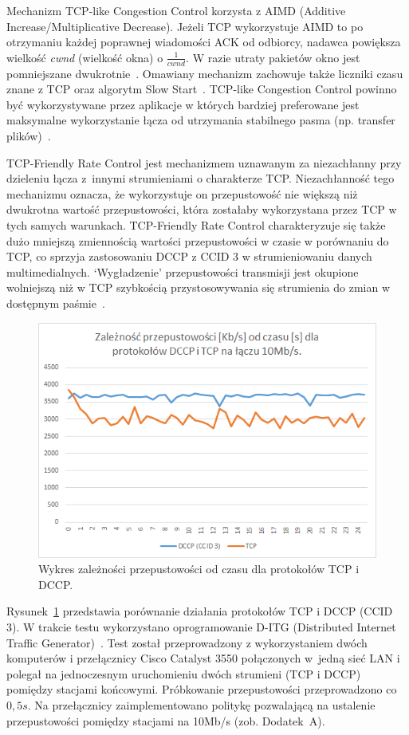 Mechanizm TCP-like Congestion Control korzysta z AIMD (Additive Increase/Multiplicative Decrease). Jeżeli TCP wykorzystuje AIMD to po otrzymaniu każdej poprawnej wiadomości ACK od odbiorcy, nadawca powiększa wielkość \textit{cwnd} (wielkość okna) o $\frac{1}{cwnd}$. W razie utraty pakietów okno jest pomniejszane dwukrotnie~\cite{Stevens}. Omawiany mechanizm zachowuje także liczniki czasu znane z TCP oraz algorytm Slow Start~\cite{RFC2581}. TCP-like Congestion Control powinno być wykorzystywane przez aplikacje w których bardziej preferowane jest maksymalne wykorzystanie łącza od utrzymania stabilnego pasma (np. transfer plików)~\cite{RFC4341}.

TCP-Friendly Rate Control jest mechanizmem uznawanym za niezachłanny przy dzieleniu łącza z~innymi strumieniami o charakterze TCP. Niezachłanność tego mechanizmu oznacza, że wykorzystuje on przepustowość nie większą niż dwukrotna wartość przepustowości, która zostałaby wykorzystana przez TCP w tych samych warunkach. TCP-Friendly Rate Control charakteryzuje się także dużo mniejszą zmiennością wartości przepustowości w czasie w porównaniu do TCP, co sprzyja zastosowaniu DCCP z CCID 3 w strumieniowaniu danych multimedialnych. `Wygładzenie' przepustowości transmisji jest okupione wolniejszą niż w TCP szybkością przystosowywania się strumienia do zmian w dostępnym paśmie~\cite{RFC5348}.


\begin{figure}[h!]
	\centering
		\includegraphics{TCP_DCCP}
	\caption{Wykres zależności przepustowości od czasu dla protokołów TCP i DCCP.}
	\label{TCP_DCCP}
\end{figure}

Rysunek~\ref{TCP_DCCP} przedstawia porównanie działania protokołów TCP i DCCP (CCID 3). W trakcie testu wykorzystano oprogramowanie D-ITG (Distributed Internet Traffic Generator)~\cite{D-ITG}. Test został przeprowadzony z wykorzystaniem dwóch komputerów i przełącznicy Cisco Catalyst 3550 połączonych w~jedną sieć LAN i polegał na jednoczesnym uruchomieniu dwóch strumieni (TCP i DCCP) pomiędzy stacjami końcowymi. Próbkowanie przepustowości przeprowadzono co $0,5s$. Na przełącznicy zaimplementowano politykę pozwalającą na ustalenie przepustowości pomiędzy stacjami na 10Mb/s (zob. Dodatek~A).

